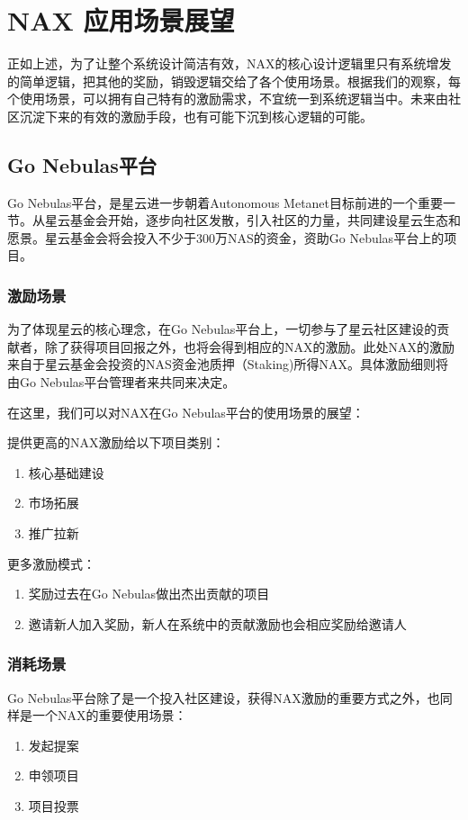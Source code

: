 \section{NAX 应用场景展望}
正如上述，为了让整个系统设计简洁有效，NAX的核心设计逻辑里只有系统增发的简单逻辑，把其他的奖励，销毁逻辑交给了各个使用场景。根据我们的观察，每个使用场景，可以拥有自己特有的激励需求，不宜统一到系统逻辑当中。未来由社区沉淀下来的有效的激励手段，也有可能下沉到核心逻辑的可能。

\subsection{Go Nebulas平台}
Go Nebulas平台，是星云进一步朝着Autonomous Metanet目标前进的一个重要一节。从星云基金会开始，逐步向社区发散，引入社区的力量，共同建设星云生态和愿景。星云基金会将会投入不少于300万NAS的资金，资助Go Nebulas平台上的项目。

\subsubsection{激励场景}
为了体现星云的核心理念，在Go Nebulas平台上，一切参与了星云社区建设的贡献者，除了获得项目回报之外，也将会得到相应的NAX的激励。此处NAX的激励来自于星云基金会投资的NAS资金池质押（Staking)所得NAX。具体激励细则将由Go Nebulas平台管理者来共同来决定。

在这里，我们可以对NAX在Go Nebulas平台的使用场景的展望：

提供更高的NAX激励给以下项目类别：
\begin{enumerate}
  \item 核心基础建设
  \item 市场拓展
  \item 推广拉新
\end{enumerate}

更多激励模式：
\begin{enumerate}
  \item 奖励过去在Go Nebulas做出杰出贡献的项目
  \item 邀请新人加入奖励，新人在系统中的贡献激励也会相应奖励给邀请人
\end{enumerate}

\subsubsection{消耗场景}
Go Nebulas平台除了是一个投入社区建设，获得NAX激励的重要方式之外，也同样是一个NAX的重要使用场景：
\begin{enumerate}
  \item 发起提案
  \item 申领项目
  \item 项目投票
\end{enumerate}

